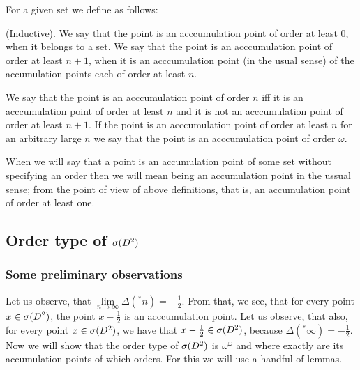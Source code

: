 For a given set we define as follows:
\begin{definition}
(Inductive). 
We say that the point is an acccumulation point of order at least $0$, when it belongs to a set. 
We say that the point is an acccumulation point of order at least $n + 1$, when it is 
an acccumulation point (in the usual sense) of the accumulation points each of order at least $n$. 
\end{definition}  
\begin{definition}
We say that the point is an acccumulation point of order $n$ iff it is an acccumulation point 
of order at least $n$ and it is not an acccumulation point of order at least $n+1$. 
If the point is an acccumulation point of order at least $n$ for an arbitrary large 
$n$ we say that 
the point is an acccumulation point of order $\omega$.
\end{definition}
When we will say that a point is an accumulation point of some set without specifying an order 
then we will mean being an accumulation point in the ussual sense; from the point of view 
of above definitions, that is, an accumulation point of order at least one.
\subsection{Order type of ${\mathcal{\sigma}(D^2)}$}
\subsubsection{Some preliminary observations}
Let us observe, that $\lim\limits_{n \to \infty} \Delta(^*n) = -\frac{1}{2}$. From that, we see, 
that for every point $x \in {\mathcal{\sigma}(D^2)}$, the point $x - \frac{1}{2}$ is an acccumulation point. 
Let us observe, that also, for every point $x \in {\mathcal{\sigma}(D^2)}$, we have that $x - \frac{1}{2} \in {\mathcal{\sigma}(D^2)}$, 
because $\Delta(^*\infty) = -\frac{1}{2}$. \\

Now we will show that the order type of ${\mathcal{\sigma}(D^2)}$ is $\omega^\omega$ and where exactly are 
its accumulation points of which orders. For this we will use  
a handful of lemmas. 

